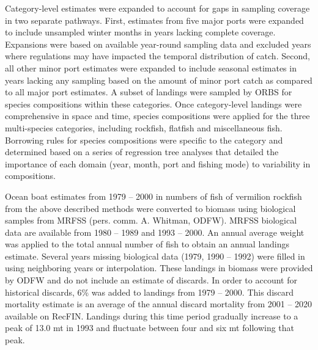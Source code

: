 \documentclass[11pt,
  english,
  a4paper,
]{article}
\begin{document}

Category-level estimates were expanded to account for gaps in sampling coverage in two separate pathways. First, estimates from five major ports were expanded to include unsampled winter months in years lacking complete coverage. Expansions were based on available year-round sampling data and excluded years where regulations may have impacted the temporal distribution of catch. Second, all other minor port estimates were expanded to include seasonal estimates in years lacking any sampling based on the amount of minor port catch as compared to all major port estimates. A subset of landings were sampled by ORBS for species compositions within these categories. Once category-level landings were comprehensive in space and time, species compositions were applied for the three multi-species categories, including rockfish, flatfish and miscellaneous fish. Borrowing rules for species compositions were specific to the category and determined based on a series of regression tree analyses that detailed the importance of each domain (year, month, port and fishing mode) to variability in compositions.

\leavevmode\tagmcend\tagstructend\par


Ocean boat estimates from 1979 -- 2000 in numbers of fish of vermilion rockfish from the above described methods were converted to biomass using biological samples from MRFSS (pers. comm. A. Whitman, ODFW). MRFSS biological data are available from 1980 -- 1989 and 1993 -- 2000. An annual average weight was applied to the total annual number of fish to obtain an annual landings estimate. Several years missing biological data (1979, 1990 -- 1992) were filled in using neighboring years or interpolation. These landings in biomass were provided by ODFW and do not include an estimate of discards. In order to account for historical discards, 6\% was added to landings from 1979 -- 2000. This discard mortality estimate is an average of the annual discard mortality from 2001 -- 2020 available on RecFIN. Landings during this time period gradually increase to a peak of 13.0 mt in 1993 and fluctuate between four and six mt following that peak.

\leavevmode\tagmcend\tagstructend\par

\end{document}

